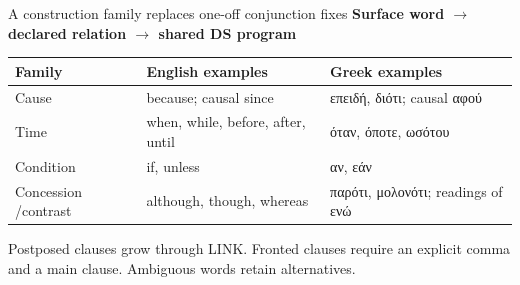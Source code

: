 \documentclass[aspectratio=169,11pt]{beamer}
\newcommand{\tagline}[1]{{\small\color{Accent}\bfseries #1}\par\medskip}
\newcommand{\aside}[1]{\par{\small\color{Muted}#1}\par}
\begin{document}
\begin{frame}{A construction family replaces one-off conjunction fixes}
  \color{Ink}
  \tagline{Surface word $\longrightarrow$ declared relation $\longrightarrow$ shared DS program}
  \begin{tabularx}{\textwidth}{@{}p{34mm}YY@{}}\toprule
    \textbf{Family} & \textbf{English examples} & \textbf{Greek examples}\\\midrule
    Cause & because; causal since & επειδή, διότι; causal αφού\\[4pt]
    Time & when, while, before, after, until & όταν, όποτε, ωσότου\\[4pt]
    Condition & if, unless & αν, εάν\\[4pt]
    Concession /\newline contrast & although, though, whereas & παρότι, μολονότι; readings of ενώ\\\bottomrule
  \end{tabularx}\par
  \vspace{4mm}
  \aside{Postposed clauses grow through LINK. Fronted clauses require an explicit comma and a main clause. Ambiguous words retain alternatives.}
\end{frame}
\end{document}
